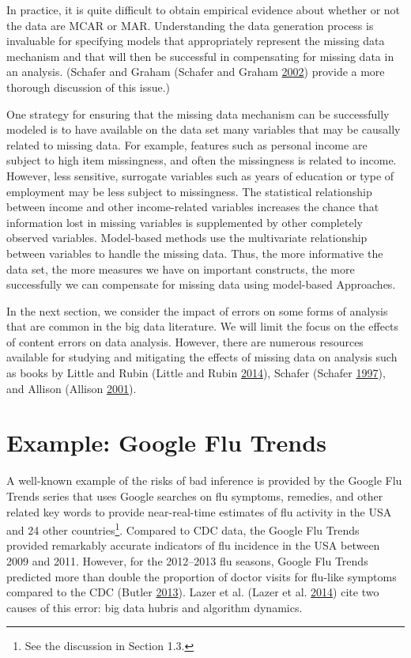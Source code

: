 \documentclass[]{krantz}
\begin{document}
In practice, it is quite difficult to obtain empirical evidence about
whether or not the data are MCAR or MAR. Understanding the data
generation process is invaluable for specifying models that
appropriately represent the missing data mechanism and that will then be
successful in compensating for missing data in an analysis. (Schafer and
Graham (Schafer and Graham
\protect\hyperlink{ref-schafer2002missing}{2002}) provide a more
thorough discussion of this issue.)

One strategy for ensuring that the missing data mechanism can be
successfully modeled is to have available on the data set many variables
that may be causally related to missing data. For example, features such
as personal income are subject to high item missingness, and often the
missingness is related to income. However, less sensitive, surrogate
variables such as years of education or type of employment may be less
subject to missingness. The statistical relationship between income and
other income-related variables increases the chance that information
lost in missing variables is supplemented by other completely observed
variables. Model-based methods use the multivariate relationship between
variables to handle the missing data. Thus, the more informative the
data set, the more measures we have on important constructs, the more
successfully we can compensate for missing data using model-based
Approaches.

In the next section, we consider the impact of errors on some forms of
analysis that are common in the big data literature. We will limit the
focus on the effects of content errors on data analysis. However, there
are numerous resources available for studying and mitigating the effects
of missing data on analysis such as books by Little and Rubin (Little
and Rubin \protect\hyperlink{ref-little2014statistical}{2014}), Schafer
(Schafer \protect\hyperlink{ref-schafer1997analysis}{1997}), and Allison
(Allison \protect\hyperlink{ref-allison2001missing}{2001}).

\section{Example: Google Flu Trends}\label{sec:10-3}

A well-known example of the risks of bad inference is provided by the
Google Flu Trends series that uses Google searches on flu symptoms,
remedies, and other related key words to provide near-real-time
estimates of flu activity in the USA and 24 other countries\footnote{See
  the discussion in Section 1.3.}. Compared to CDC data, the Google Flu
Trends provided remarkably accurate indicators of flu incidence in the
USA between 2009 and 2011. However, for the 2012--2013 flu seasons,
Google Flu Trends predicted more than double the proportion of doctor
visits for flu-like symptoms compared to the CDC (Butler
\protect\hyperlink{ref-butler2013google}{2013}). Lazer et al. (Lazer et
al. \protect\hyperlink{ref-lazer2014parable}{2014}) cite two causes of
this error: big data hubris and algorithm dynamics.
\end{document}

